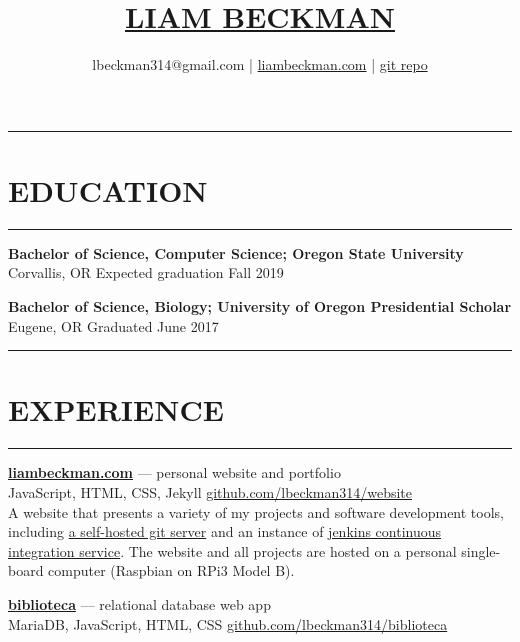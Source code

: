 \documentclass[a4paper]{article}
\title{\underline{LIAM BECKMAN}}
\author{lbeckman314@gmail.com |  \href{https://liambeckman.com}{liambeckman.com} | \href{https://github.com/lbeckman314}{git repo}}
\date{\vspace{-5ex}}
\begin{document}
\maketitle

\noindent\rule{\textwidth}{1pt}\vspace{-1.5em}
\section*{EDUCATION}\vspace{-1.5em}
\textcolor[RGB]{128,128,128}{\rule{\linewidth}{1pt}}

\medbreak

\textbf{Bachelor of Science, Computer Science; Oregon State University}\\ 
\textcolor[RGB]{128,128,128}{Corvallis, OR \hfill Expected graduation Fall 2019}

\textcolor[RGB]{128,128,128}{\dotfill}
\medbreak

\textbf{Bachelor of Science, Biology; University of Oregon Presidential Scholar}\\ 
\textcolor[RGB]{128,128,128}{Eugene, OR \hfill Graduated June 2017}

\noindent\rule{\textwidth}{1pt}\vspace{-1.5em}
\section*{EXPERIENCE}\vspace{-1.5em}
\textcolor[RGB]{128,128,128}{\rule{\linewidth}{1pt}}


\textbf{\href{https://liambeckman.com}{liambeckman.com}} --- personal website and portfolio\\
\textcolor[RGB]{128,128,128}{JavaScript, HTML, CSS, Jekyll \hfill \href{https://github.com/lbeckman314/website}{github.com/lbeckman314/website}}\\

A website that presents a variety of my projects and software development tools, including \href{https://git.liambeckman.com}{a self-hosted git server} and an instance of \href{https://liambeckman.com/jenkins}{jenkins continuous integration service}. The website and all projects are hosted on a personal single-board computer (Raspbian on RPi3 Model B).

\textcolor[RGB]{128,128,128}{\dotfill}
\medbreak

\textbf{\href{https://biblioteca.liambeckman.com}{biblioteca}} --- relational database web app\\
\textcolor[RGB]{128,128,128}{MariaDB, JavaScript, HTML, CSS \hfill \href{https://github.com/lbeckman314/biblioteca}{github.com/lbeckman314/biblioteca}}\\
\end{document}
